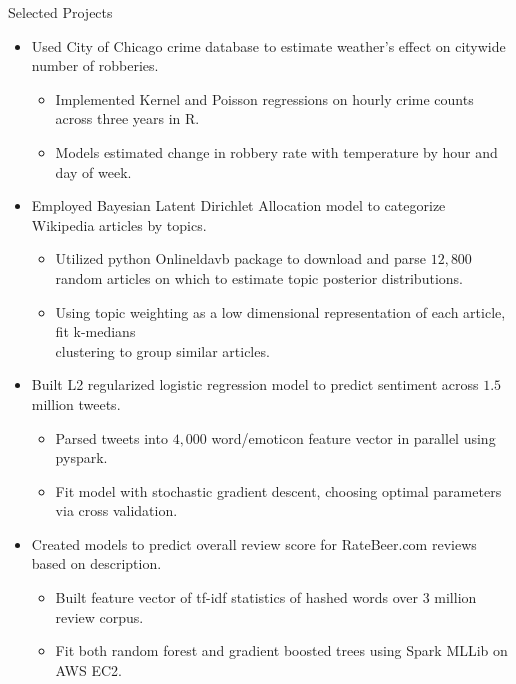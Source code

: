 \documentclass{resume} %
\begin{document}

\begin{rSection}{Selected Projects}
    \begin{itemize}
        \item Used City of Chicago crime database to estimate weather's effect on citywide number of robberies.
            \begin{itemize} 
                \item Implemented Kernel and Poisson regressions on hourly crime counts across three years in R.
                \item Models estimated change in robbery rate with temperature by hour and day of week.
            \end{itemize}
        \item Employed Bayesian Latent Dirichlet Allocation model to categorize Wikipedia articles by topics.
            \begin{itemize} 
                \item Utilized python Onlineldavb package to download and parse $12,\!800$ random articles on which to estimate topic posterior distributions.   
                \item Using topic weighting as a low dimensional representation of each article, fit k-medians \\clustering to group similar articles.
            \end{itemize}
        \item Built L2 regularized logistic regression model to predict sentiment across $1.5$ million tweets.
            \begin{itemize} 
                \item Parsed tweets into $4,\!000$ word/emoticon feature vector in parallel using pyspark.
                \item Fit model with stochastic gradient descent, choosing optimal parameters via cross validation.
            \end{itemize}
        \item Created models to predict overall review score for RateBeer.com reviews based on description.
            \begin{itemize} 
                \item Built feature vector of tf-idf statistics of hashed words over 3 million review corpus.
                \item Fit both random forest and gradient boosted trees using Spark MLLib on AWS EC2.
            \end{itemize}

    \end{itemize} 
\end{rSection}
\end{document}
